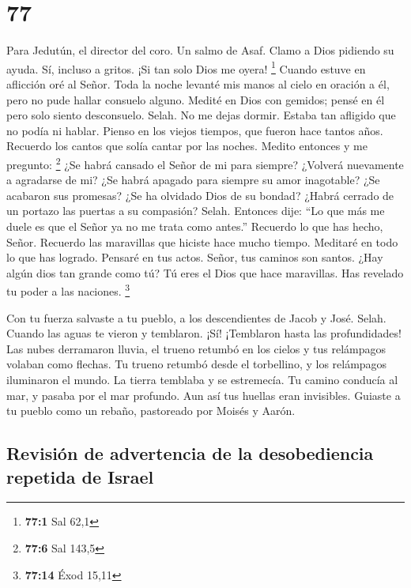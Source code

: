 \hypertarget{section-76}{%
\section{77}\label{section-76}}

Para Jedutún, el director del coro. Un salmo de Asaf.  Clamo
a Dios pidiendo su ayuda. Sí, incluso a gritos. ¡Si tan solo Dios me
oyera! \footnote{\textbf{77:1} Sal 62,1}  Cuando estuve en
aflicción oré al Señor. Toda la noche levanté mis manos al cielo en
oración a él, pero no pude hallar consuelo alguno.  Medité
en Dios con gemidos; pensé en él pero solo siento desconsuelo. Selah.
 No me dejas dormir. Estaba tan afligido que no podía ni
hablar.  Pienso en los viejos tiempos, que fueron hace
tantos años.  Recuerdo los cantos que solía cantar por las
noches. Medito entonces y me pregunto: \footnote{\textbf{77:6} Sal 143,5}
 ¿Se habrá cansado el Señor de mi para siempre? ¿Volverá
nuevamente a agradarse de mi?  ¿Se habrá apagado para
siempre su amor inagotable? ¿Se acabaron sus promesas?  ¿Se
ha olvidado Dios de su bondad? ¿Habrá cerrado de un portazo las puertas
a su compasión? Selah.  Entonces dije: ``Lo que más me
duele es que el Señor ya no me trata como antes.'' 
Recuerdo lo que has hecho, Señor. Recuerdo las maravillas que hiciste
hace mucho tiempo.  Meditaré en todo lo que has logrado.
Pensaré en tus actos.  Señor, tus caminos son santos. ¿Hay
algún dios tan grande como tú?  Tú eres el Dios que hace
maravillas. Has revelado tu poder a las naciones. \footnote{\textbf{77:14}
  Éxod 15,11}

 Con tu fuerza salvaste a tu pueblo, a los descendientes de
Jacob y José. Selah.  Cuando las aguas te vieron y
temblaron. ¡Sí! ¡Temblaron hasta las profundidades!  Las
nubes derramaron lluvia, el trueno retumbó en los cielos y tus
relámpagos volaban como flechas.  Tu trueno retumbó desde
el torbellino, y los relámpagos iluminaron el mundo. La tierra temblaba
y se estremecía.  Tu camino conducía al mar, y pasaba por
el mar profundo. Aun así tus huellas eran invisibles. 
Guiaste a tu pueblo como un rebaño, pastoreado por Moisés y Aarón.

\hypertarget{revisiuxf3n-de-advertencia-de-la-desobediencia-repetida-de-israel}{%
\subsection{Revisión de advertencia de la desobediencia repetida de
Israel}\label{revisiuxf3n-de-advertencia-de-la-desobediencia-repetida-de-israel}}

